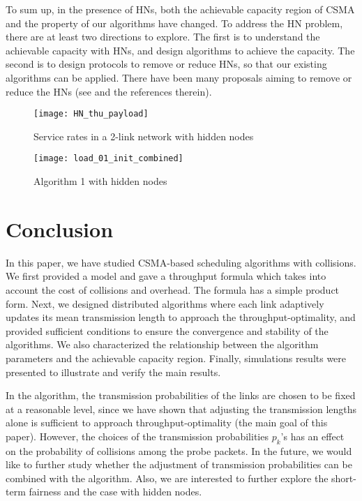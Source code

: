 \documentclass{IEEEtran}
\begin{document}
To sum up, in the presence of HNs, both the achievable capacity region
of CSMA and the property of our algorithms have changed. To address
the HN problem, there are at least two directions to explore. The
first is to understand the achievable capacity with HNs, and design
algorithms to achieve the capacity. The second is to design protocols
to remove or reduce HNs, so that our existing algorithms can be applied.
There have been many proposals aiming to remove or reduce the HNs
(see \cite{Jiang-Liew} and the references therein). \begin{figure}
\begin{centering}
\texttt{[image: HN\_thu\_payload]}
\par\end{centering}

\caption{\label{fig:Service-rates-HN}Service rates in a 2-link network with
hidden nodes}

\end{figure}
\begin{figure}
\begin{centering}
\texttt{[image: load\_01\_init\_combined]}
\par\end{centering}

\caption{\label{fig:Algorithm-1-HN}Algorithm 1 with hidden nodes}

\end{figure}



\section{\label{sec:Conclusion}Conclusion}

In this paper, we have studied CSMA-based scheduling algorithms with
collisions. We first provided a model and gave a throughput formula
which takes into account the cost of collisions and overhead. The
formula has a simple product form. Next, we designed distributed algorithms
where each link adaptively updates its mean transmission length to
approach the throughput-optimality, and provided sufficient conditions
to ensure the convergence and stability of the algorithms. We also
characterized the relationship between the algorithm parameters and
the achievable capacity region. Finally, simulations results were
presented to illustrate and verify the main results.

In the algorithm, the transmission probabilities of the links are
chosen to be fixed at a reasonable level, since we have shown that
adjusting the transmission lengths alone is sufficient to approach
throughput-optimality (the main goal of this paper). However, the
choices of the transmission probabilities $p_{k}$'s has an effect
on the probability of collisions among the probe packets. In the future,
we would like to further study whether the adjustment of transmission
probabilities can be combined with the algorithm. Also, we are interested
to further explore the short-term fairness and the case with hidden
nodes.
\end{document}
